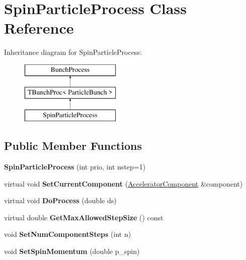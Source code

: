 \hypertarget{classSpinParticleProcess}{}\section{Spin\+Particle\+Process Class Reference}
\label{classSpinParticleProcess}
Inheritance diagram for Spin\+Particle\+Process\+:\begin{figure}[H]
\begin{center}
\leavevmode
\includegraphics[height=3.000000cm]{classSpinParticleProcess}
\end{center}
\end{figure}
\subsection*{Public Member Functions}
\begin{DoxyCompactItemize}
\item 
\mbox{\label{classSpinParticleProcess_aad0c37f458551d3cc028d784d3638f4f}} 
{\bfseries Spin\+Particle\+Process} (int prio, int nstep=1)
\item 
\mbox{\label{classSpinParticleProcess_acd27add20b0f473ea640be6097a96f51}} 
virtual void {\bfseries Set\+Current\+Component} (\hyperlink{classAcceleratorComponent}{Accelerator\+Component} \&component)
\item 
\mbox{\label{classSpinParticleProcess_a312d06f9f97a4567f740b58e6d5d44e2}} 
virtual void {\bfseries Do\+Process} (double ds)
\item 
\mbox{\label{classSpinParticleProcess_a4fae8388761bf9a97f541d8eac5ae976}} 
virtual double {\bfseries Get\+Max\+Allowed\+Step\+Size} () const
\item 
\mbox{\label{classSpinParticleProcess_ae1b919b3bf48b7de49f05b4686bc8ae5}} 
void {\bfseries Set\+Num\+Component\+Steps} (int n)
\item 
\mbox{\label{classSpinParticleProcess_a9fed16b076c2f41b8fc00c02dbe8c637}} 
void {\bfseries Set\+Spin\+Momentum} (double p\+\_\+spin)
\end{DoxyCompactItemize}
